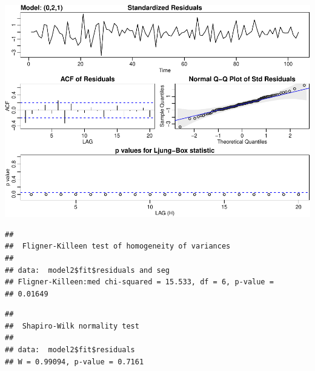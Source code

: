 \documentclass[]{article}
\newenvironment{Shaded}{\begin{snugshade}}{\end{snugshade}}
\newcommand{\DataTypeTok}[1]{\textcolor[rgb]{0.13,0.29,0.53}{#1}}
\newcommand{\DecValTok}[1]{\textcolor[rgb]{0.00,0.00,0.81}{#1}}
\newcommand{\KeywordTok}[1]{\textcolor[rgb]{0.13,0.29,0.53}{\textbf{#1}}}
\newcommand{\NormalTok}[1]{#1}
\newcommand{\OperatorTok}[1]{\textcolor[rgb]{0.81,0.36,0.00}{\textbf{#1}}}
\newcommand{\StringTok}[1]{\textcolor[rgb]{0.31,0.60,0.02}{#1}}
\begin{document}
\begin{center}\includegraphics{bookings_forecast_files/figure-latex/unnamed-chunk-10-1} \end{center}

\begin{Shaded}
\end{Shaded}

\begin{verbatim}
## 
##  Fligner-Killeen test of homogeneity of variances
## 
## data:  model2$fit$residuals and seg
## Fligner-Killeen:med chi-squared = 15.533, df = 6, p-value =
## 0.01649
\end{verbatim}

\begin{Shaded}
\end{Shaded}

\begin{verbatim}
## 
##  Shapiro-Wilk normality test
## 
## data:  model2$fit$residuals
## W = 0.99094, p-value = 0.7161
\end{verbatim}
\end{document}
